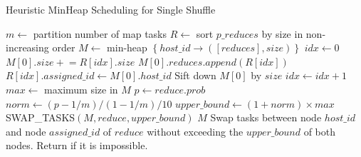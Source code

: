\begin{minipage}{0.95\columnwidth}
\begin{algorithm}[H]
\caption{Heuristic MinHeap Scheduling for Single Shuffle}
\label{hminheap}
	\begin{algorithmic}[1]
	\small
		\State $m\gets$ partition number of map tasks
		\State $R\gets$ sort $p\_reduces$ by size in non-increasing order
		\State $M\gets$ min-heap $\left\{ host\_id \rightarrow \left( \left[ reduces \right], size \right) \right\}$
		\State $idx\gets 0$
		\State $M\left[0\right].size \mathrel{+}= R\left[idx\right].size$
		\State $M\left[0\right].reduces.append\left(R\left[idx\right]\right)$
		\State $R\left[idx\right].assigned\_id \gets M \left[0\right].host\_id$
		\State Sift down $M\left[0\right]$ by $size$
		\State $idx\gets idx+1$
		\EndWhile
		\State $max\gets$ maximum size in $M$
				\State $p\gets reduce.prob$
				\State $norm\gets \left(p-1/m\right)/\left(1-1/m\right)/10$
				\State $upper\_bound \gets \left(1 + norm\right) \times max$
				\State SWAP\_TASKS$\left(M, reduce, upper\_bound\right)$
			\EndIf
		\EndFor
		\Return $M$
	\EndProcedure
		\State Swap tasks between node $host\_id$ and node $assigned\_id$
		\State of $reduce$ without exceeding the $upper\_bound$
		\State of both nodes.
		\State Return if it is impossible.
	\EndProcedure
	\end{algorithmic}
\end{algorithm}
\end{minipage}

